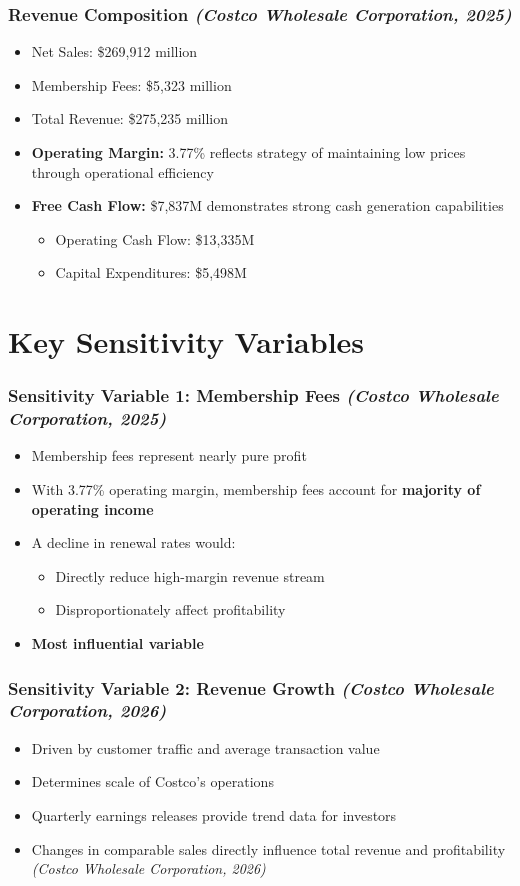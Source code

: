 \documentclass[11pt]{beamer}
\begin{document}
\begin{frame}
\frametitle{Revenue Composition \textit{(Costco Wholesale Corporation, 2025)}}
\begin{itemize}
  \item Net Sales: \$269,912 million
  \item Membership Fees: \$5,323 million
  \item Total Revenue: \$275,235 million
  \vspace{0.3cm}
  \item \textbf{Operating Margin:} 3.77\% reflects strategy of maintaining low prices through operational efficiency
  \item \textbf{Free Cash Flow:} \$7,837M demonstrates strong cash generation capabilities
    \begin{itemize}
      \item Operating Cash Flow: \$13,335M
      \item Capital Expenditures: \$5,498M
    \end{itemize}
\end{itemize}
\end{frame}

\section{Key Sensitivity Variables}
\begin{frame}
\frametitle{Sensitivity Variable 1: Membership Fees \textit{(Costco Wholesale Corporation, 2025)}}
\begin{itemize}
  \item Membership fees represent nearly pure profit
  \item With 3.77\% operating margin, membership fees account for \textbf{majority of operating income}
  \item A decline in renewal rates would:
    \begin{itemize}
      \item Directly reduce high-margin revenue stream
      \item Disproportionately affect profitability
    \end{itemize}
  \item \textbf{Most influential variable}
\end{itemize}
\end{frame}

\begin{frame}
\frametitle{Sensitivity Variable 2: Revenue Growth \textit{(Costco Wholesale Corporation, 2026)}}
\begin{itemize}
  \item Driven by customer traffic and average transaction value
  \item Determines scale of Costco's operations
  \item Quarterly earnings releases provide trend data for investors
  \item Changes in comparable sales directly influence total revenue and profitability \textit{(Costco Wholesale Corporation, 2026)}
\end{itemize}
\end{frame}
\end{document}
